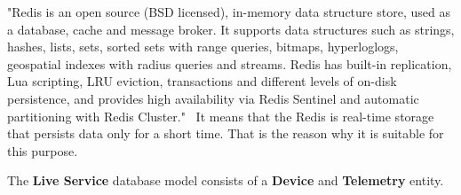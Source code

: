 "Redis is an open source (BSD licensed), in-memory data structure store, used as a database, cache and message broker.
It supports data structures such as strings, hashes, lists, sets, sorted sets with range queries, bitmaps, hyperloglogs, geospatial indexes with radius queries and streams.
Redis has built-in replication, Lua scripting, LRU eviction, transactions and different levels of on-disk persistence, and provides high availability via Redis Sentinel and automatic partitioning with Redis Cluster."~\cite{redis}
It means that the Redis is real-time storage that persists data only for a short time.
That is the reason why it is suitable for this purpose.

The \textbf{Live Service} database model consists of a \textbf{Device} and \textbf{Telemetry} entity.

